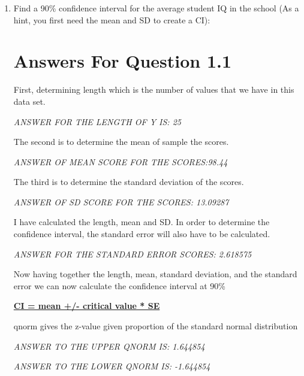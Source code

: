 \documentclass[12pt,letterpaper]{article}
\begin{document}
\begin{enumerate}
	\item Find a 90\% confidence interval for the average student IQ in the school (As a hint, you first need the mean and SD to create a CI):\\
	
	
	\section*{Answers For Question 1.1}
	
First, determining length which is the number of values that we have in this data set. 



\textit{ANSWER FOR THE LENGTH OF Y IS: 25}

The second is to determine the mean of sample the scores. 


 
 \textit{ANSWER OF MEAN SCORE FOR THE SCORES:98.44}
 
 The third is to determine the standard deviation of the scores.
 


 \textit{ANSWER OF SD SCORE FOR THE SCORES: 13.09287}
 
	I have calculated the  length, mean and SD. In order to determine the 
	confidence interval, the standard error will also have to be calculated.
 
 
 	
\textit{ANSWER FOR THE STANDARD ERROR SCORES: 2.618575 }
 
Now having together the length, mean, standard deviation, and the standard error we can now calculate the confidence interval at 90\%
 
\textbf{\underline{ CI = mean +/- critical value * SE
 }}
	
	
 
	qnorm gives the z-value given proportion of the standard normal distribution
 
 
 

	\textit{ANSWER TO THE UPPER QNORM IS:  1.644854}
	
	\textit{ANSWER TO THE LOWER QNORM IS: -1.644854}
 

\end{enumerate}
\end{document}
